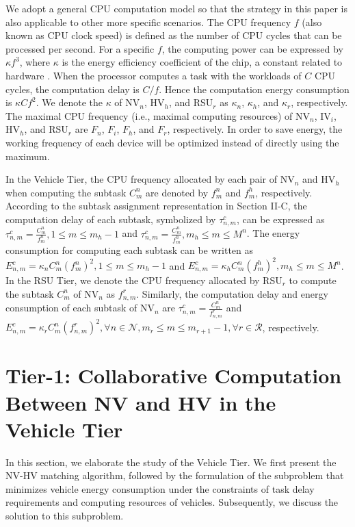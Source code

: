 \documentclass[lettersize,journal]{IEEEtran}
\begin{document}
We adopt a general CPU computation model so that the strategy in this paper is also applicable to other more specific scenarios. The CPU frequency $f$ (also known as CPU clock speed) is defined as the number of CPU cycles that can be processed per second. For a specific $f$, the computing power can be expressed by $\kappa f^3$, where $\kappa$ is the energy efficiency coefficient of the chip, a constant related to hardware \cite{ref8}. When the processor computes a task with the workloads of $C$ CPU cycles, the computation delay is $C/f$. Hence the computation energy consumption is $\kappa Cf^2$. We denote the $\kappa$ of NV$_n$, HV$_h$, and RSU$_r$ as $\kappa_n$, $\kappa_h$, and $\kappa_r$, respectively. The maximal CPU frequency (i.e., maximal computing resources) of NV$_n$, IV$_i$, HV$_h$, and RSU$_r$ are $F_n$, $F_i$, $F_h$, and $F_r$, respectively. In order to save energy, the working frequency of each device will be optimized instead of directly using the maximum.

In the Vehicle Tier, the CPU frequency allocated by each pair of NV$_n$ and HV$_h$ when computing the subtask $C_m^n$ are denoted by $f^n_m$ and $f^h_m$, respectively. According to the subtask assignment representation in Section II-C, the computation delay of each subtask, symbolized by $\tau_{n,m}^c$, can be expressed as $\tau_{n,m}^c=\frac{C_m^n}{f^n_m}, 1\leq m \leq m_h-1$ and $\tau_{n,m}^c=\frac{C_m^n}{f^h_m}, m_h\leq m \leq M^n$. The energy consumption for computing each subtask can be written as $E_{n,m}^c=\kappa_n C_m^n\left(f^n_m\right)^2, 1\leq m \leq m_h-1$ and $E_{n,m}^c=\kappa_h C_m^n\left(f^h_m\right)^2, m_h\leq m \leq M^n$. In the RSU Tier, we denote the CPU frequency allocated by RSU$_r$ to compute the subtask $C^n_m$ of NV$_n$ as $f^r_{n,m}$. Similarly, the computation delay and energy consumption of each subtask of NV$_n$ are $\tau^c_{n,m}=\frac{C_m^n}{f^r_{n,m}}$ and $E^{c}_{n,m}=\kappa_r C_m^n\left(f^r_{n,m}\right)^2, \forall n \in \mathcal{N}, m_r\leq m \leq m_{r+1}-1, \forall r \in \mathcal{R}$, respectively.




\section{Tier-1: Collaborative Computation Between NV and HV in the Vehicle Tier}
In this section, we elaborate the study of the Vehicle Tier. We first present the NV-HV matching algorithm, followed by the formulation of the subproblem that minimizes vehicle energy consumption under the constraints of task delay requirements and computing resources of vehicles. Subsequently, we discuss the solution to this subproblem.
\end{document}
